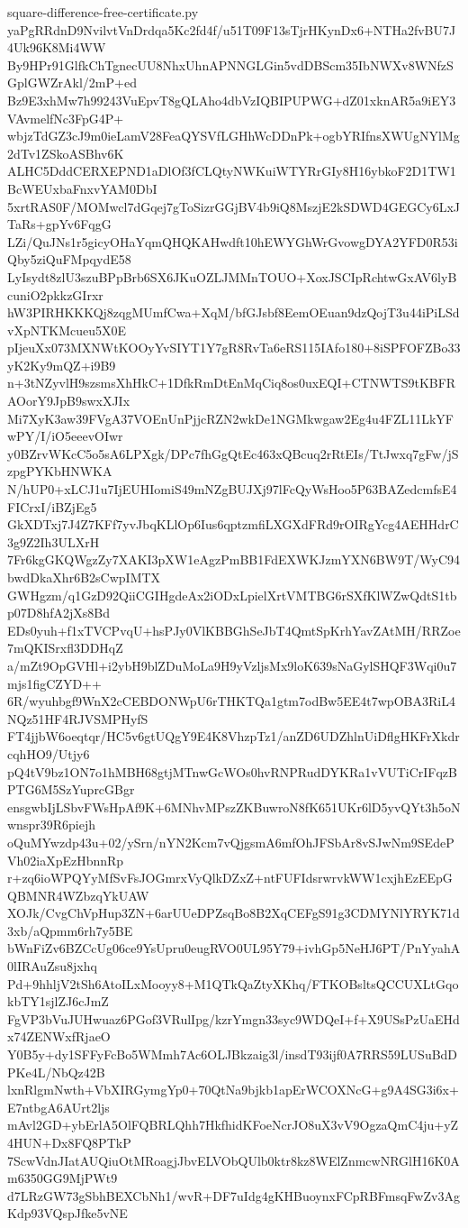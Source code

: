 \documentclass[11pt]{article}
\theoremstyle{definition}
\theoremstyle{remark}
\begin{document}
\begin{filecontents*}[overwrite]{square-difference-free-certificate.py}
yaPgRRdnD9NvilvtVnDrdqa5Kc2fd4f/u51T09F13sTjrHKynDx6+NTHa2fvBU7J4Uk96K8Mi4WW
By9HPr91GlfkChTgnecUU8NhxUhnAPNNGLGin5vdDBScm35IbNWXv8WNfzSGplGWZrAkl/2mP+ed
Bz9E3xhMw7h99243VuEpvT8gQLAho4dbVzIQBIPUPWG+dZ01xknAR5a9iEY3VAvmelfNc3FpG4P+
wbjzTdGZ3cJ9m0ieLamV28FeaQYSVfLGHhWcDDnPk+ogbYRIfnsXWUgNYlMg2dTv1ZSkoASBhv6K
ALHC5DddCERXEPND1aDlOf3fCLQtyNWKuiWTYRrGIy8H16ybkoF2D1TW1BcWEUxbaFnxvYAM0DbI
5xrtRAS0F/MOMwcl7dGqej7gToSizrGGjBV4b9iQ8MszjE2kSDWD4GEGCy6LxJTaRs+gpYv6FqgG
LZi/QuJNs1r5gicyOHaYqmQHQKAHwdft10hEWYGhWrGvowgDYA2YFD0R53iQby5ziQuFMpqydE58
LyIsydt8zlU3szuBPpBrb6SX6JKuOZLJMMnTOUO+XoxJSCIpRchtwGxAV6lyBcuniO2pkkzGIrxr
hW3PIRHKKKQj8zqgMUmfCwa+XqM/bfGJsbf8EemOEuan9dzQojT3u44iPiLSdvXpNTKMcueu5X0E
pIjeuXx073MXNWtKOOyYvSIYT1Y7gR8RvTa6eRS115IAfo180+8iSPFOFZBo33yK2Ky9mQZ+i9B9
n+3tNZyvlH9szsmsXhHkC+1DfkRmDtEnMqCiq8os0uxEQI+CTNWTS9tKBFRAOorY9JpB9swxXJIx
Mi7XyK3aw39FVgA37VOEnUnPjjcRZN2wkDe1NGMkwgaw2Eg4u4FZL11LkYFwPY/I/iO5eeevOIwr
y0BZrvWKcC5o5sA6LPXgk/DPc7fhGgQtEc463xQBcuq2rRtEIs/TtJwxq7gFw/jSzpgPYKbHNWKA
N/hUP0+xLCJ1u7IjEUHIomiS49mNZgBUJXj97lFcQyWsHoo5P63BAZedcmfsE4FICrxI/iBZjEg5
GkXDTxj7J4Z7KFf7yvJbqKLlOp6Ius6qptzmfiLXGXdFRd9rOIRgYcg4AEHHdrC3g9Z2Ih3ULXrH
7Fr6kgGKQWgzZy7XAKI3pXW1eAgzPmBB1FdEXWKJzmYXN6BW9T/WyC94bwdDkaXhr6B2sCwpIMTX
GWHgzm/q1GzD92QiiCGIHgdeAx2iODxLpielXrtVMTBG6rSXfKlWZwQdtS1tbp07D8hfA2jXs8Bd
EDs0yuh+f1xTVCPvqU+hsPJy0VlKBBGhSeJbT4QmtSpKrhYavZAtMH/RRZoe7mQKISrxfl3DDHqZ
a/mZt9OpGVHl+i2ybH9blZDuMoLa9H9yVzljsMx9loK639sNaGylSHQF3Wqi0u7mjs1figCZYD++
6R/wyuhbgf9WnX2cCEBDONWpU6rTHKTQa1gtm7odBw5EE4t7wpOBA3RiL4NQz51HF4RJVSMPHyfS
FT4jjbW6oeqtqr/HC5v6gtUQgY9E4K8VhzpTz1/anZD6UDZhlnUiDflgHKFrXkdrcqhHO9/Utjy6
pQ4tV9bz1ON7o1hMBH68gtjMTnwGcWOs0hvRNPRudDYKRa1vVUTiCrIFqzBPTG6M5SzYuprcGBgr
ensgwbIjLSbvFWsHpAf9K+6MNhvMPszZKBuwroN8fK651UKr6lD5yvQYt3h5oNwnspr39R6piejh
oQuMYwzdp43u+02/ySrn/nYN2Kcm7vQjgsmA6mfOhJFSbAr8vSJwNm9SEdePVh02iaXpEzHbnnRp
r+zq6ioWPQYyMfSvFsJOGmrxVyQlkDZxZ+ntFUFIdsrwrvkWW1cxjhEzEEpGQBMNR4WZbzqYkUAW
XOJk/CvgChVpHup3ZN+6arUUeDPZsqBo8B2XqCEFgS91g3CDMYNlYRYK71d3xb/aQpmm6rh7y5BE
bWnFiZv6BZCcUg06ce9YsUpru0eugRVO0UL95Y79+ivhGp5NeHJ6PT/PnYyahA0lIRAuZsu8jxhq
Pd+9hhljV2tSh6AtoILxMooyy8+M1QTkQaZtyXKhq/FTKOBsltsQCCUXLtGqokbTY1sjlZJ6cJmZ
FgVP3bVuJUHwuaz6PGof3VRulIpg/kzrYmgn33syc9WDQeI+f+X9USsPzUaEHdx74ZENWxfRjaeO
Y0B5y+dy1SFFyFcBo5WMmh7Ac6OLJBkzaig3l/insdT93ijf0A7RRS59LUSuBdDPKe4L/NbQz42B
lxnRlgmNwth+VbXIRGymgYp0+70QtNa9bjkb1apErWCOXNcG+g9A4SG3i6x+E7ntbgA6AUrt2ljs
mAvl2GD+ybErlA5OlFQBRLQhh7HkfhidKFoeNcrJO8uX3vV9OgzaQmC4ju+yZ4HUN+Dx8FQ8PTkP
7ScwVdnJIatAUQiuOtMRoagjJbvELVObQUlb0ktr8kz8WElZnmcwNRGlH16K0Am6350GG9MjPWt9
d7LRzGW73gSbhBEXCbNh1/wvR+DF7uIdg4gKHBuoynxFCpRBFmsqFwZv3AgKdp93VQspJfke5vNE

\end{filecontents*}
\end{document}

